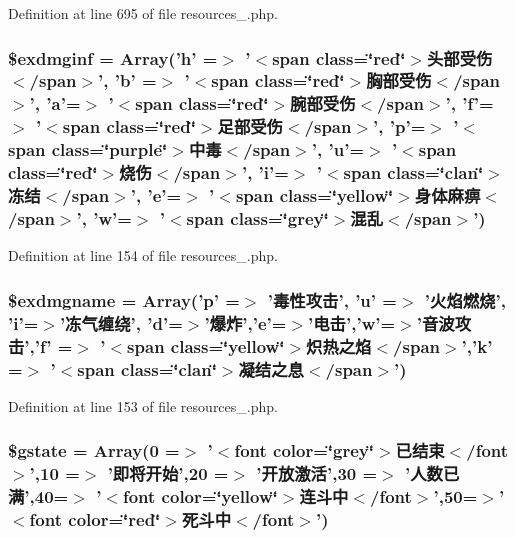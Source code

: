 Definition at line 695 of file resources\+\_.\+php.

\hypertarget{resources__1_8php_a2de6851aa38cafa604576a1dc520e631}{
\subsubsection[{\$exdmginf}]{\setlength{\rightskip}{0pt plus 5cm}\$exdmginf = Array('h' =$>$ '$<$span class=\char`\"{}red\char`\"{}$>$头部受伤$<$/span$>$', 'b' =$>$ '$<$span class=\char`\"{}red\char`\"{}$>$胸部受伤$<$/span$>$', 'a'=$>$ '$<$span class=\char`\"{}red\char`\"{}$>$腕部受伤$<$/span$>$', 'f'=$>$ '$<$span class=\char`\"{}red\char`\"{}$>$足部受伤$<$/span$>$', 'p'=$>$ '$<$span class=\char`\"{}purple\char`\"{}$>$中毒$<$/span$>$', 'u'=$>$ '$<$span class=\char`\"{}red\char`\"{}$>$烧伤$<$/span$>$', 'i'=$>$ '$<$span class=\char`\"{}clan\char`\"{}$>$冻结$<$/span$>$', 'e'=$>$ '$<$span class=\char`\"{}yellow\char`\"{}$>$身体麻痹$<$/span$>$', 'w'=$>$ '$<$span class=\char`\"{}grey\char`\"{}$>$混乱$<$/span$>$')}}\label{resources__1_8php_a2de6851aa38cafa604576a1dc520e631}


Definition at line 154 of file resources\+\_.\+php.

\hypertarget{resources__1_8php_ae3d186083abb3ad845df2562e1c1df79}{
\subsubsection[{\$exdmgname}]{\setlength{\rightskip}{0pt plus 5cm}\$exdmgname = Array('p' =$>$ '毒性攻击', 'u' =$>$ '火焰燃烧', 'i'=$>$'冻气缠绕', 'd'=$>$'爆炸','e'=$>$'电击','w'=$>$'音波攻击','f' =$>$ '$<$span class=\char`\"{}yellow\char`\"{}$>$炽热之焰$<$/span$>$','k' =$>$ '$<$span class=\char`\"{}clan\char`\"{}$>$凝结之息$<$/span$>$')}}\label{resources__1_8php_ae3d186083abb3ad845df2562e1c1df79}


Definition at line 153 of file resources\+\_.\+php.

\hypertarget{resources__1_8php_a5aed3a3ce44a1f7125854d31c7f61a6b}{
\subsubsection[{\$gstate}]{\setlength{\rightskip}{0pt plus 5cm}\$gstate = Array(0 =$>$ '$<$font color=\char`\"{}grey\char`\"{}$>$已结束$<$/font$>$',10 =$>$ '即将开始',20 =$>$ '开放激活',30 =$>$ '人数已满',40=$>$ '$<$font color=\char`\"{}yellow\char`\"{}$>$连斗中$<$/font$>$',50=$>$'$<$font color=\char`\"{}red\char`\"{}$>$死斗中$<$/font$>$')}}\label{resources__1_8php_a5aed3a3ce44a1f7125854d31c7f61a6b}



